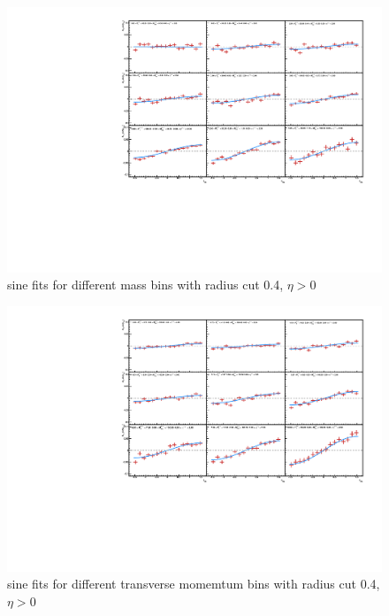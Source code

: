 \documentclass[letterpaper, abstract = on,listof=totoc, bibliography=totoc]{scrreprt}
\begin{document}
\begin{appendices}
\begin{figure}
\begin{center}
\includegraphics[width = 1\textwidth]{cone4Vm_hiEtaV2.pdf}
\caption[sine fits for different mass bins with radius cut 0.4]{sine fits for different mass bins with radius cut 0.4, $\eta > 0$}
\label{}
\end{center}
\end{figure}

\begin{figure}
\begin{center}
\includegraphics[width = 1\textwidth]{cone4Vpt_hiEtaV2.pdf}
\caption[sine fits for different transverse momemtum bins with radius cut 0.4]{sine fits for different transverse momemtum bins with radius cut 0.4, $\eta > 0$}
\label{}
\end{center}
\end{figure}


\end{appendices}
\end{document}
